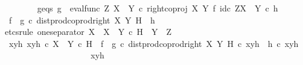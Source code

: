 \begin{isabellebody}
\ \ \ \ \ \ \isamarkupfalse%
\ g{\isacharunderscore}{\kern0pt}eqs{\isacharcolon}{\kern0pt}\ {\isachardoublequoteopen}g\ {\isacharequal}{\kern0pt}\ {\isacharparenleft}{\kern0pt}eval{\isacharunderscore}{\kern0pt}func\ Z\ {\isacharparenleft}{\kern0pt}X\ {\isasymCoprod}\ Y{\isacharparenright}{\kern0pt}\ {\isasymcirc}\isactrlsub c\ right{\isacharunderscore}{\kern0pt}coproj\ X\ Y\ {\isasymtimes}\isactrlsub f\ id\isactrlsub c\ {\isacharparenleft}{\kern0pt}Z\isactrlbsup {\isacharparenleft}{\kern0pt}X\ {\isasymCoprod}\ Y{\isacharparenright}{\kern0pt}\isactrlesup {\isacharparenright}{\kern0pt}{\isacharparenright}{\kern0pt}\isactrlsup {\isasymsharp}\ {\isasymcirc}\isactrlsub c\ h{\isachardoublequoteclose}\isanewline
\ \ \ \ \ \ \isamarkupfalse%
\ {\isachardoublequoteopen}{\isacharparenleft}{\kern0pt}f\isactrlsup {\isasymflat}\ {\isasymamalg}\ g\isactrlsup {\isasymflat}\ {\isasymcirc}\isactrlsub c\ dist{\isacharunderscore}{\kern0pt}prod{\isacharunderscore}{\kern0pt}coprod{\isacharunderscore}{\kern0pt}right\ X\ Y\ H{\isacharparenright}{\kern0pt}\ {\isacharequal}{\kern0pt}\ h\isactrlsup {\isasymflat}{\isachardoublequoteclose}\isanewline
\ \ \ \ \ \ \isamarkupfalse%
{\isacharparenleft}{\kern0pt}etcs{\isacharunderscore}{\kern0pt}rule\ one{\isacharunderscore}{\kern0pt}separator{\isacharbrackleft}{\kern0pt}\ X\ {\isacharequal}{\kern0pt}\ {\isachardoublequoteopen}{\isacharparenleft}{\kern0pt}X\ {\isasymCoprod}\ Y{\isacharparenright}{\kern0pt}\ {\isasymtimes}\isactrlsub c\ H{\isachardoublequoteclose}{\isacharcomma}{\kern0pt}\ \ Y\ {\isacharequal}{\kern0pt}\ Z{\isacharbrackright}{\kern0pt}{\isacharparenright}{\kern0pt}\isanewline
\ \ \ \ \ \ \ \ \isamarkupfalse%
\ {\isachardoublequoteopen}{\isasymAnd}xyh{\isachardot}{\kern0pt}\ xyh\ {\isasymin}\isactrlsub c\ {\isacharparenleft}{\kern0pt}X\ {\isasymCoprod}\ Y{\isacharparenright}{\kern0pt}\ {\isasymtimes}\isactrlsub c\ H\ {\isasymLongrightarrow}\ {\isacharparenleft}{\kern0pt}f\isactrlsup {\isasymflat}\ {\isasymamalg}\ g\isactrlsup {\isasymflat}\ {\isasymcirc}\isactrlsub c\ dist{\isacharunderscore}{\kern0pt}prod{\isacharunderscore}{\kern0pt}coprod{\isacharunderscore}{\kern0pt}right\ X\ Y\ H{\isacharparenright}{\kern0pt}\ {\isasymcirc}\isactrlsub c\ xyh\ {\isacharequal}{\kern0pt}\ h\isactrlsup {\isasymflat}\ {\isasymcirc}\isactrlsub c\ xyh{\isachardoublequoteclose}\isanewline
\ \ \ \ \ \ \ \ \isamarkupfalse%
{\isacharminus}{\kern0pt}\isanewline
\ \ \ \ \ \ \ \ \ \ \isamarkupfalse%
\ xyh\isanewline

\end{isabellebody}
